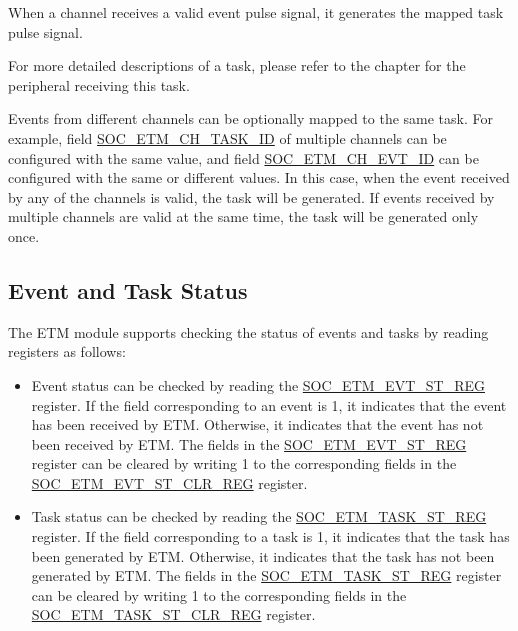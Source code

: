 \documentclass[main\_\_EN.tex]{subfiles}
\begin{document}
When a channel receives a valid event pulse signal, it generates the mapped task pulse signal.

For more detailed descriptions of a task, please refer to the chapter for the peripheral receiving this task.

Events from different channels can be optionally mapped to the same task. For example, field \hyperref[fielddesc:SOCETMCH0TASKID]{SOC\_ETM\_CH\_TASK\_ID} of multiple channels can be configured with the same value, and field \hyperref[fielddesc:SOCETMCH0EVTID]{SOC\_ETM\_CH\_EVT\_ID} can be configured with the same or different values. In this case, when the event received by any of the channels is valid, the task will be generated. If events received by multiple channels are valid at the same time, the task will be generated only once.

\subsection{Event and Task Status}

The ETM module supports checking the status of events and tasks by reading registers as follows:

\begin{itemize}
    \item Event status can be checked by reading the \hyperref[regdesc:SOCETMEVTST0REG]{SOC\_ETM\_EVT\_ST\_REG} register. If the field corresponding to an event is 1, it indicates that the event has been received by ETM. Otherwise, it indicates that the event has not been received by ETM. The fields in the \hyperref[regdesc:SOCETMEVTST0REG]{SOC\_ETM\_EVT\_ST\_REG} register can be cleared by writing 1 to the corresponding fields in the \hyperref[regdesc:SOCETMEVTST0CLRREG]{SOC\_ETM\_EVT\_ST\_CLR\_REG} register.
    \item Task status can be checked by reading the \hyperref[regdesc:SOCETMTASKST0REG]{SOC\_ETM\_TASK\_ST\_REG} register. If the field corresponding to a task is 1, it indicates that the task has been generated by ETM. Otherwise, it indicates that the task has not been generated by ETM. The fields in the \hyperref[regdesc:SOCETMTASKST0REG]{SOC\_ETM\_TASK\_ST\_REG} register can be cleared by writing 1 to the corresponding fields in the \hyperref[regdesc:SOCETMTASKST0CLRREG]{SOC\_ETM\_TASK\_ST\_CLR\_REG} register.
\end{itemize}
\end{document}
